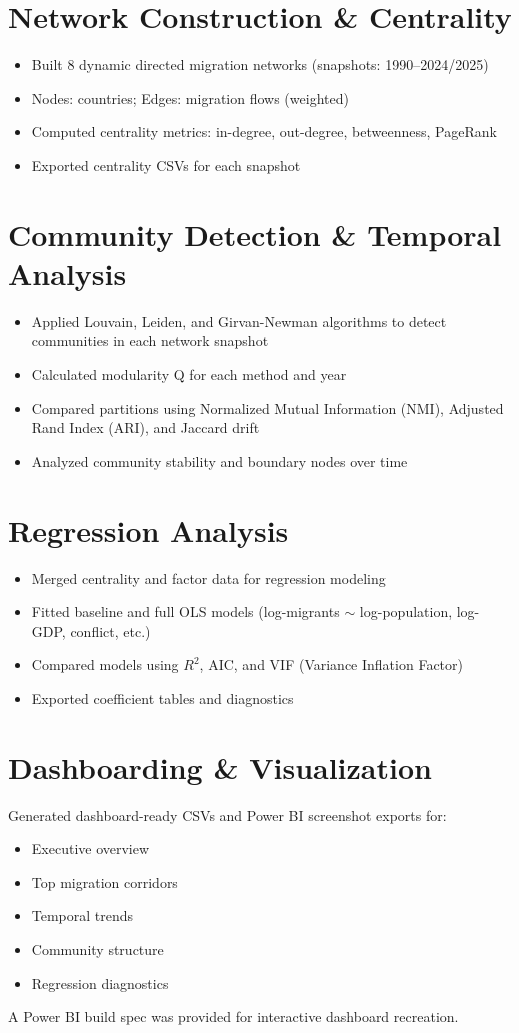 \documentclass[12pt]{article}
\begin{document}
\section{Network Construction \& Centrality}
\begin{itemize}
  \item Built 8 dynamic directed migration networks (snapshots: 1990--2024/2025)
  \item Nodes: countries; Edges: migration flows (weighted)
  \item Computed centrality metrics: in-degree, out-degree, betweenness, PageRank
  \item Exported centrality CSVs for each snapshot
\end{itemize}

\section{Community Detection \& Temporal Analysis}
\begin{itemize}
  \item Applied Louvain, Leiden, and Girvan-Newman algorithms to detect communities in each network snapshot
  \item Calculated modularity Q for each method and year
  \item Compared partitions using Normalized Mutual Information (NMI), Adjusted Rand Index (ARI), and Jaccard drift
  \item Analyzed community stability and boundary nodes over time
\end{itemize}

\section{Regression Analysis}
\begin{itemize}
  \item Merged centrality and factor data for regression modeling
  \item Fitted baseline and full OLS models (log-migrants $\sim$ log-population, log-GDP, conflict, etc.)
  \item Compared models using $R^2$, AIC, and VIF (Variance Inflation Factor)
  \item Exported coefficient tables and diagnostics
\end{itemize}

\section{Dashboarding \& Visualization}
Generated dashboard-ready CSVs and Power BI screenshot exports for:
\begin{itemize}
  \item Executive overview
  \item Top migration corridors
  \item Temporal trends
  \item Community structure
  \item Regression diagnostics
\end{itemize}
A Power BI build spec was provided for interactive dashboard recreation.
\end{document}
